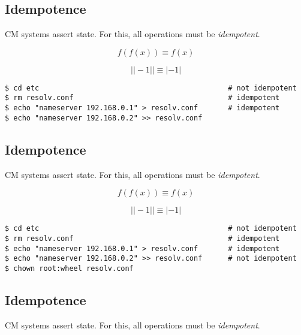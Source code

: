 \documentclass[xga]{xdvislides}
\begin{document}
\subsection{Idempotence}
CM systems assert state.  For this, all operations
must be {\em idempotent}. \\
\vspace{.5in}

\begin{displaymath}
f(f(x)) \equiv f(x)
\end{displaymath}

\begin{displaymath}
| |-1| | \equiv |-1|
\end{displaymath}

\begin{verbatim}
$ cd etc                                            # not idempotent
$ rm resolv.conf                                    # idempotent
$ echo "nameserver 192.168.0.1" > resolv.conf       # idempotent
$ echo "nameserver 192.168.0.2" >> resolv.conf
\end{verbatim}

\subsection{Idempotence}
CM systems assert state.  For this, all operations
must be {\em idempotent}. \\
\vspace{.5in}

\begin{displaymath}
f(f(x)) \equiv f(x)
\end{displaymath}

\begin{displaymath}
| |-1| | \equiv |-1|
\end{displaymath}

\begin{verbatim}
$ cd etc                                            # not idempotent
$ rm resolv.conf                                    # idempotent
$ echo "nameserver 192.168.0.1" > resolv.conf       # idempotent
$ echo "nameserver 192.168.0.2" >> resolv.conf      # not idempotent
$ chown root:wheel resolv.conf
\end{verbatim}

\subsection{Idempotence}
CM systems assert state.  For this, all operations
must be {\em idempotent}. \\
\vspace{.5in}
\end{document}
